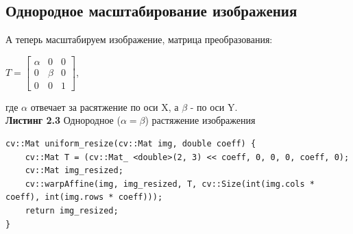     \subsection{Однородное масштабирование изображения}
    \noindent А теперь масштабируем изображение, матрица преобразования:
    \begin{center}
        $
        T = 
        \begin{bmatrix}
            \alpha & 0 & 0\\
            0 & \beta & 0\\
            0 & 0 & 1
        \end{bmatrix}
        $,
    \end{center}
    где $\alpha$ отвечает за расятжение по оси X, а $\beta$ - по оси Y.
    \\ \noindent \textbf{Листинг 2.3} Однородное ($\alpha = \beta$) растяжение изображения
    \begin{lstlisting}
cv::Mat uniform_resize(cv::Mat img, double coeff) {
    cv::Mat T = (cv::Mat_ <double>(2, 3) << coeff, 0, 0, 0, coeff, 0);
    cv::Mat img_resized;
    cv::warpAffine(img, img_resized, T, cv::Size(int(img.cols * coeff), int(img.rows * coeff)));
    return img_resized;
} 
    \end{lstlisting}

